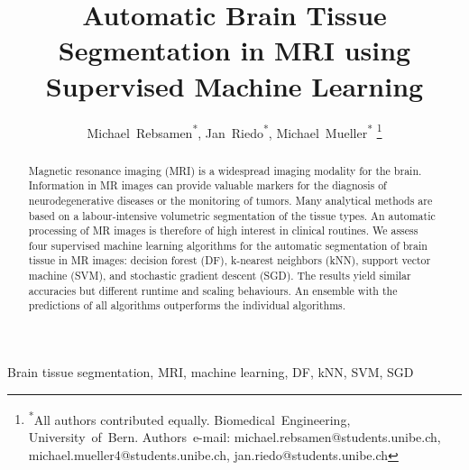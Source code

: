 \documentclass[journal]{IEEEtran}
\begin{document}
\title{Automatic Brain Tissue Segmentation in MRI using Supervised Machine Learning}

\author{Michael~Rebsamen\textsuperscript{*},
        Jan~Riedo\textsuperscript{*},
        Michael~Mueller\textsuperscript{*}
\thanks{\textsuperscript{*}All authors contributed equally. Biomedical~Engineering, University~of~Bern. Authors~e-mail: michael.rebsamen@students.unibe.ch, michael.mueller4@students.unibe.ch, jan.riedo@students.unibe.ch}}
{}%
\maketitle

\begin{abstract}
Magnetic resonance imaging (MRI) is a widespread imaging modality for the brain. Information in MR images can provide valuable markers for the diagnosis of neurodegenerative diseases or the monitoring of tumors. Many analytical methods are based on a labour-intensive volumetric segmentation of the tissue types. An automatic processing of MR images is therefore of high interest in clinical routines. We assess four supervised machine learning algorithms for the automatic segmentation of brain tissue in MR images: decision forest (DF), k-nearest neighbors (kNN), support vector machine (SVM), and stochastic gradient descent (SGD). The results yield similar accuracies but different runtime and scaling behaviours. An ensemble with the predictions of all algorithms outperforms the individual algorithms.
\end{abstract}



\begin{IEEEkeywords}
Brain tissue segmentation, MRI, machine learning, DF, kNN, SVM, SGD
\end{IEEEkeywords}
\end{document}
